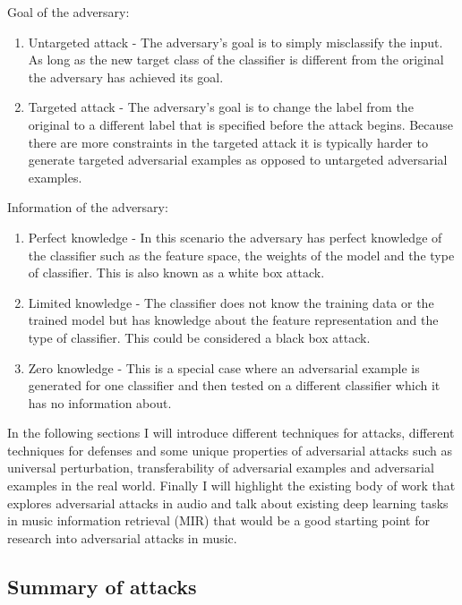 \documentclass[journal,onecolumn]{IEEEtran}
\begin{document}
Goal of the adversary:
\begin{enumerate}
\item Untargeted attack - The adversary's goal is to simply misclassify the input. As long as the new target class of the classifier is different from the original the adversary has achieved its goal.
\item Targeted attack - The adversary's goal is to change the label from the original to a different label that is specified before the attack begins. Because there are more constraints in the targeted attack it is typically harder to generate targeted adversarial examples as opposed to untargeted adversarial examples.
\end{enumerate}

Information of the adversary:
\begin{enumerate}
\item Perfect knowledge - In this scenario the adversary has perfect knowledge of the classifier such as the feature space, the weights of the model and the type of classifier. This is also known as a white box attack.
\item Limited knowledge - The classifier does not know the training data or the trained model but has knowledge about the feature representation and the type of classifier. This could be considered a black box attack.
\item Zero knowledge - This is a special case where an adversarial example is generated for one classifier and then tested on a different classifier which it has no information about.
\end{enumerate}

In the following sections I will introduce different techniques for attacks, different techniques for defenses and some unique properties of adversarial attacks such as universal perturbation, transferability of adversarial examples and adversarial examples in the real world. Finally I will highlight the existing body of work that explores adversarial attacks in audio and talk about existing deep learning tasks in music information retrieval (MIR) that would be a good starting point for research into adversarial attacks in music.


\subsection{Summary of attacks}
\end{document}
